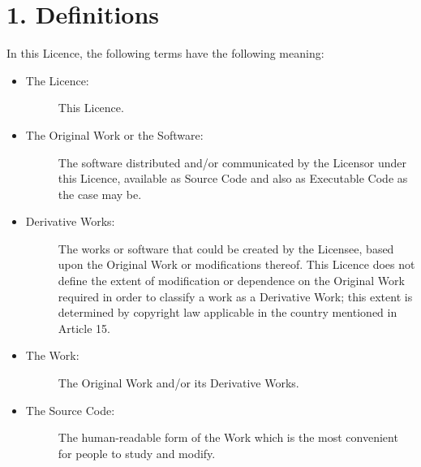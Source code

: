 \documentclass[letterpaper,10pt,english]{sphinxmanual}
\begin{document}
\section{1. Definitions}
\label{license:definitions}
In this Licence, the following terms have the following meaning:
\begin{itemize}
\item {} \begin{description}
\item[{The Licence:}] \leavevmode
This Licence.

\end{description}

\item {} \begin{description}
\item[{The Original Work or the Software:}] \leavevmode
The software distributed and/or communicated by the Licensor under this Licence,
available as Source Code and also as Executable Code as the case may be.

\end{description}

\item {} \begin{description}
\item[{Derivative Works:}] \leavevmode
The works or software that could be created by the Licensee,
based upon the Original Work or modifications thereof. This Licence does not define
the extent of modification or dependence on the Original Work required in order to
classify a work as a Derivative Work; this extent is determined by copyright law
applicable in the country mentioned in Article 15.

\end{description}

\item {} \begin{description}
\item[{The Work:}] \leavevmode
The Original Work and/or its Derivative Works.

\end{description}

\item {} \begin{description}
\item[{The Source Code:}] \leavevmode
The human-readable form of the Work which is the most convenient for people to study and modify.

\end{description}


\end{itemize}
\end{document}
